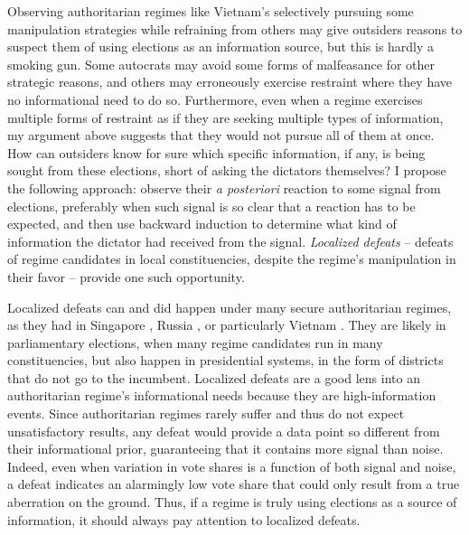 \documentclass[12pt]{article}
\newcommand{\1}{\mathbbm{1}}
\begin{document}
Observing authoritarian regimes like Vietnam’s selectively pursuing some manipulation strategies while refraining from others may give outsiders reasons to suspect them of using elections as an information source, but this is hardly a smoking gun. Some autocrats may avoid some forms of malfeasance for other strategic reasons, and others may erroneously exercise restraint where they have no informational need to do so. Furthermore, even when a regime exercises multiple forms of restraint as if they are seeking multiple types of information, my argument above suggests that they would not pursue all of them at once. How can outsiders know for sure which specific information, if any, is being sought from these elections, short of asking the dictators themselves?  I propose the following approach: observe their \textit{a posteriori} reaction to some signal from elections, preferably when such signal is so clear that a reaction has to be expected, and then use backward induction to determine what kind of information the dictator had received from the signal. \textit{Localized defeats} -- defeats of regime candidates in local constituencies, despite the regime's manipulation in their favor -- provide one such opportunity.


Localized defeats can and did happen under many secure authoritarian regimes, as they had in Singapore \citep{Ortmann2011, Miller2015}, Russia \citep{Gelman2013}, or particularly Vietnam \citep{MaleskySchuler2011}. They are likely in parliamentary elections, when many regime candidates run in many constituencies, but also happen in presidential systems, in the form of districts that do not go to the incumbent. Localized defeats are a good lens into an authoritarian regime's informational needs because they are high-information events. Since authoritarian regimes rarely suffer and thus do not expect unsatisfactory results, any defeat would provide a data point so different from their informational prior, guaranteeing that it contains more signal than noise. Indeed, even when variation in vote shares is a function of both signal and noise, a defeat indicates an alarmingly low vote share that could only result from a true aberration on the ground. Thus, if a regime is truly using elections as a source of information, it should always pay attention to localized defeats. 
\end{document}
